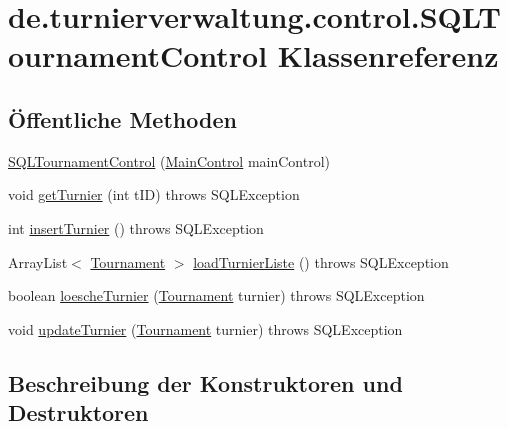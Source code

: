 \hypertarget{classde_1_1turnierverwaltung_1_1control_1_1_s_q_l_tournament_control}{}\section{de.\+turnierverwaltung.\+control.\+S\+Q\+L\+Tournament\+Control Klassenreferenz}
\label{classde_1_1turnierverwaltung_1_1control_1_1_s_q_l_tournament_control}
\subsection*{Öffentliche Methoden}
\begin{DoxyCompactItemize}
\item 
\hyperlink{classde_1_1turnierverwaltung_1_1control_1_1_s_q_l_tournament_control_afd7af65169834253812f571ff66714dc}{S\+Q\+L\+Tournament\+Control} (\hyperlink{classde_1_1turnierverwaltung_1_1control_1_1_main_control}{Main\+Control} main\+Control)
\item 
void \hyperlink{classde_1_1turnierverwaltung_1_1control_1_1_s_q_l_tournament_control_ae1b7c10c4a19bf5e7b567cb7cf4dc4b1}{get\+Turnier} (int t\+ID)  throws S\+Q\+L\+Exception 
\item 
int \hyperlink{classde_1_1turnierverwaltung_1_1control_1_1_s_q_l_tournament_control_ab0ed469982ec93863184caacd5520035}{insert\+Turnier} ()  throws S\+Q\+L\+Exception 
\item 
Array\+List$<$ \hyperlink{classde_1_1turnierverwaltung_1_1model_1_1_tournament}{Tournament} $>$ \hyperlink{classde_1_1turnierverwaltung_1_1control_1_1_s_q_l_tournament_control_ae53371ca53eb412903af04c960b3542c}{load\+Turnier\+Liste} ()  throws S\+Q\+L\+Exception 
\item 
boolean \hyperlink{classde_1_1turnierverwaltung_1_1control_1_1_s_q_l_tournament_control_a368a70e0fa8671fb229b35340b853e03}{loesche\+Turnier} (\hyperlink{classde_1_1turnierverwaltung_1_1model_1_1_tournament}{Tournament} turnier)  throws S\+Q\+L\+Exception 
\item 
void \hyperlink{classde_1_1turnierverwaltung_1_1control_1_1_s_q_l_tournament_control_a5a208595e36661cedb33edfd0e40738d}{update\+Turnier} (\hyperlink{classde_1_1turnierverwaltung_1_1model_1_1_tournament}{Tournament} turnier)  throws S\+Q\+L\+Exception 
\end{DoxyCompactItemize}


\subsection{Beschreibung der Konstruktoren und Destruktoren}
